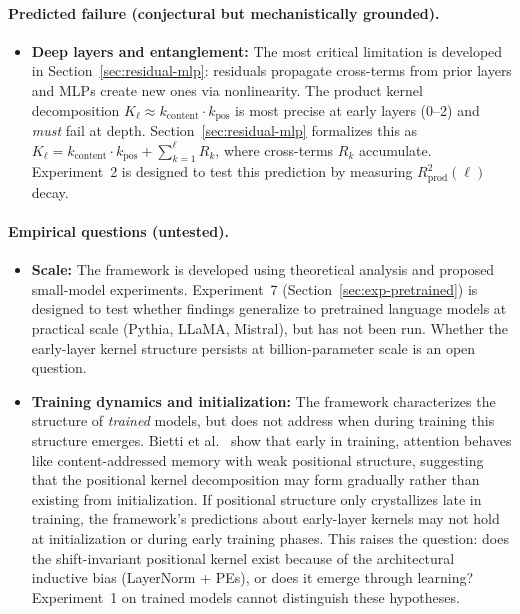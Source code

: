 \documentclass[11pt]{article}
\theoremstyle{definition}
\begin{document}
\paragraph{Predicted failure (conjectural but mechanistically grounded).}
\begin{itemize}
    \item \textbf{Deep layers and entanglement:} The most critical limitation is developed in Section~\ref{sec:residual-mlp}: residuals propagate cross-terms from prior layers and MLPs create new ones via nonlinearity. The product kernel decomposition $K_\ell \approx k_{\text{content}} \cdot k_{\text{pos}}$ is most precise at early layers (0--2) and \emph{must} fail at depth. Section~\ref{sec:residual-mlp} formalizes this as $K_\ell = k_{\text{content}} \cdot k_{\text{pos}} + \sum_{k=1}^\ell R_k$, where cross-terms $R_k$ accumulate. Experiment~2 is designed to test this prediction by measuring $R^2_{\text{prod}}(\ell)$ decay.
\end{itemize}

\paragraph{Empirical questions (untested).}
\begin{itemize}
    \item \textbf{Scale:} The framework is developed using theoretical analysis and proposed small-model experiments. Experiment~7 (Section~\ref{sec:exp-pretrained}) is designed to test whether findings generalize to pretrained language models at practical scale (Pythia, LLaMA, Mistral), but has not been run. Whether the early-layer kernel structure persists at billion-parameter scale is an open question.
    \item \textbf{Training dynamics and initialization:} The framework characterizes the structure of \emph{trained} models, but does not address when during training this structure emerges. Bietti et al.\ \cite{bietti2024spectral} show that early in training, attention behaves like content-addressed memory with weak positional structure, suggesting that the positional kernel decomposition may form gradually rather than existing from initialization. If positional structure only crystallizes late in training, the framework's predictions about early-layer kernels may not hold at initialization or during early training phases. This raises the question: does the shift-invariant positional kernel exist because of the architectural inductive bias (LayerNorm + PEs), or does it emerge through learning? Experiment~1 on trained models cannot distinguish these hypotheses.
\end{itemize}
\end{document}
